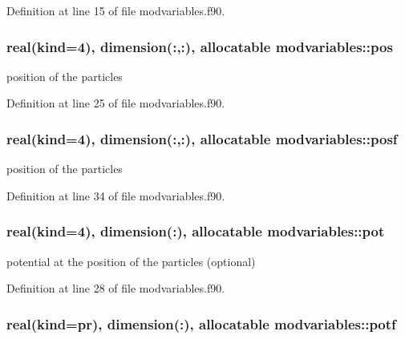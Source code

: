 Definition at line 15 of file modvariables.\+f90.

\subsubsection[{\texorpdfstring{pos}{pos}}]{\setlength{\rightskip}{0pt plus 5cm}real(kind=4), dimension(\+:,\+:), allocatable modvariables\+::pos}\hypertarget{namespacemodvariables_a2f72d5750b0cf2e9bfa6e139d09c6862}{}\label{namespacemodvariables_a2f72d5750b0cf2e9bfa6e139d09c6862}


position of the particles 



Definition at line 25 of file modvariables.\+f90.

\subsubsection[{\texorpdfstring{posf}{posf}}]{\setlength{\rightskip}{0pt plus 5cm}real(kind=4), dimension(\+:,\+:), allocatable modvariables\+::posf}\hypertarget{namespacemodvariables_a7528c234a190760e036921b956ec9fe8}{}\label{namespacemodvariables_a7528c234a190760e036921b956ec9fe8}


position of the particles 



Definition at line 34 of file modvariables.\+f90.

\subsubsection[{\texorpdfstring{pot}{pot}}]{\setlength{\rightskip}{0pt plus 5cm}real(kind=4), dimension(\+:), allocatable modvariables\+::pot}\hypertarget{namespacemodvariables_a872451e872cc528b38bd43f2ed09b446}{}\label{namespacemodvariables_a872451e872cc528b38bd43f2ed09b446}


potential at the position of the particles (optional) 



Definition at line 28 of file modvariables.\+f90.

\subsubsection[{\texorpdfstring{potf}{potf}}]{\setlength{\rightskip}{0pt plus 5cm}real(kind=pr), dimension(\+:), allocatable modvariables\+::potf}\hypertarget{namespacemodvariables_a719beead34fb4c6c7c70e7f51f1dfc78}{}\label{namespacemodvariables_a719beead34fb4c6c7c70e7f51f1dfc78}


